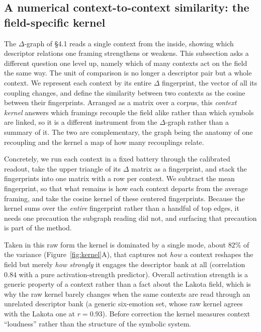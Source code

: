 \documentclass[final,creativeai]{article}
\begin{document}
\subsection{A numerical context-to-context similarity: the field-specific kernel}
The $\Delta$-graph of \S4.1 reads a single context from the inside, showing which descriptor relations one framing strengthens or weakens. This subsection asks a different question one level up, namely which of many contexts act on the field the same way. The unit of comparison is no longer a descriptor pair but a whole context. We represent each context by its entire $\Delta$ fingerprint, the vector of all its coupling changes, and define the similarity between two contexts as the cosine between their fingerprints. Arranged as a matrix over a corpus, this \emph{context kernel} answers which framings recouple the field alike rather than which symbols are linked, so it is a different instrument from the $\Delta$-graph rather than a summary of it. The two are complementary, the graph being the anatomy of one recoupling and the kernel a map of how many recouplings relate.

Concretely, we run each context in a fixed battery through the calibrated readout, take the upper triangle of its $\Delta$ matrix as a fingerprint, and stack the fingerprints into one matrix with a row per context. We subtract the mean fingerprint, so that what remains is how each context departs from the average framing, and take the cosine kernel of these centered fingerprints. Because the kernel sums over the \emph{entire} fingerprint rather than a handful of top edges, it needs one precaution the subgraph reading did not, and surfacing that precaution is part of the method.

Taken in this raw form the kernel is dominated by a single mode, about $82\%$ of the variance (Figure~\ref{fig:kernel}A), that captures not \emph{how} a context reshapes the field but merely \emph{how strongly} it engages the descriptor bank at all (correlation $0.84$ with a pure activation-strength predictor). Overall activation strength is a generic property of a context rather than a fact about the Lakota field, which is why the raw kernel barely changes when the same contexts are read through an unrelated descriptor bank (a generic six-emotion set, whose raw kernel agrees with the Lakota one at $r=0.93$). Before correction the kernel measures context ``loudness'' rather than the structure of the symbolic system.
\end{document}
